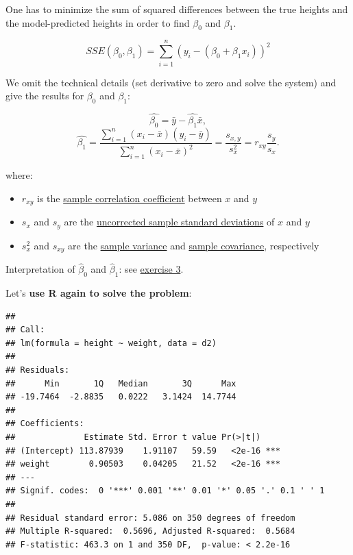\documentclass[
]{book}
\newenvironment{Shaded}{\begin{snugshade}}{\end{snugshade}}
\newcommand{\AttributeTok}[1]{\textcolor[rgb]{0.13,0.29,0.53}{#1}}
\newcommand{\DecValTok}[1]{\textcolor[rgb]{0.00,0.00,0.81}{#1}}
\newcommand{\FunctionTok}[1]{\textcolor[rgb]{0.13,0.29,0.53}{\textbf{#1}}}
\newcommand{\NormalTok}[1]{#1}
\newcommand{\OtherTok}[1]{\textcolor[rgb]{0.56,0.35,0.01}{#1}}
\newcommand{\SpecialCharTok}[1]{\textcolor[rgb]{0.81,0.36,0.00}{\textbf{#1}}}
\providecommand{\tightlist}{%
  \setlength{\itemsep}{0pt}\setlength{\parskip}{0pt}}
\begin{document}
One has to minimize the sum of squared differences between the true heights and
the model-predicted heights in order to find \(\beta_0\) and \(\beta_1\).

\[SSE(\beta_0, \beta_1) = \sum_{i=1}^n (y_i - (\beta_0 + \beta_1 x_i))^2\]

We omit the technical details (set derivative to zero and solve the system) and give the results for \(\beta_0\) and \(\beta_1\):

\[
\hat{\beta_0} = \bar{y} - \hat{\beta_1} \bar{x},
\]
\[
\hat{\beta_1} = \frac{\sum_{i=1}^n (x_i - \bar{x})(y_i - \bar{y})}{\sum_{i=1}^n (x_i - \bar{x})^2} =
 \frac{s_{x,y}}{s_x^2} = r_{xy} \frac{s_y}{s_x}.
\]

where:

\begin{itemize}
\tightlist
\item
  \(r_{xy}\) is the \href{https://en.wikipedia.org/wiki/Pearson_correlation_coefficient}{sample correlation coefficient} between \(x\) and \(y\)
\item
  \(s_x\) and \(s_y\) are the \href{https://en.wikipedia.org/wiki/Standard_deviation}{uncorrected sample standard deviations} of \(x\) and \(y\)
\item
  \(s_x^2\) and \(s_{xy}\) are the \href{https://en.wikipedia.org/wiki/Variance}{sample variance} and \href{https://en.wikipedia.org/wiki/Covariance}{sample covariance}, respectively
\end{itemize}

Interpretation of \(\hat{\beta}_0\) and \(\hat{\beta}_1\): see \hyperref[exercise3_simpl_lin_reg]{exercise 3}.

Let's \textbf{use R again to solve the problem}:

\begin{Shaded}
\end{Shaded}

\begin{verbatim}
## 
## Call:
## lm(formula = height ~ weight, data = d2)
## 
## Residuals:
##      Min       1Q   Median       3Q      Max 
## -19.7464  -2.8835   0.0222   3.1424  14.7744 
## 
## Coefficients:
##              Estimate Std. Error t value Pr(>|t|)    
## (Intercept) 113.87939    1.91107   59.59   <2e-16 ***
## weight        0.90503    0.04205   21.52   <2e-16 ***
## ---
## Signif. codes:  0 '***' 0.001 '**' 0.01 '*' 0.05 '.' 0.1 ' ' 1
## 
## Residual standard error: 5.086 on 350 degrees of freedom
## Multiple R-squared:  0.5696, Adjusted R-squared:  0.5684 
## F-statistic: 463.3 on 1 and 350 DF,  p-value: < 2.2e-16
\end{verbatim}
\end{document}
